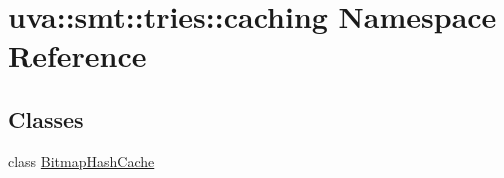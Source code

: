 \hypertarget{namespaceuva_1_1smt_1_1tries_1_1caching}{}\section{uva\+:\+:smt\+:\+:tries\+:\+:caching Namespace Reference}
\label{namespaceuva_1_1smt_1_1tries_1_1caching}
\subsection*{Classes}
\begin{DoxyCompactItemize}
\item 
class \hyperlink{classuva_1_1smt_1_1tries_1_1caching_1_1_bitmap_hash_cache}{Bitmap\+Hash\+Cache}
\end{DoxyCompactItemize}
